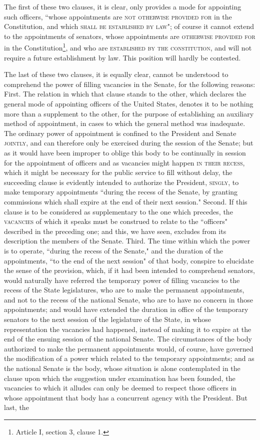 The first of these two clauses, it is clear, only provides a mode for appointing such officers, ``whose appointments are \textsc{not otherwise provided for }in the Constitution, and which \textsc{shall be established by law}"; of course it cannot extend to the appointments of senators, whose appointments are \textsc{otherwise provided for }in the Constitution\footnote{Article I, section 3, clause 1.}, and who are \textsc{established by the constitution}, and will not require a future establishment by law. This position will hardly be contested.

The last of these two clauses, it is equally clear, cannot be understood to comprehend the power of filling vacancies in the Senate, for the following reasons: First. The relation in which that clause stands to the other, which declares the general mode of appointing officers of the United States, denotes it to be nothing more than a supplement to the other, for the purpose of establishing an auxiliary method of appointment, in cases to which the general method was inadequate. The ordinary power of appointment is confined to the President and Senate \textsc{jointly}, and can therefore only be exercised during the session of the Senate; but as it would have been improper to oblige this body to be continually in session for the appointment of officers and as vacancies might happen \textsc{in their recess}, which it might be necessary for the public service to fill without delay, the succeeding clause is evidently intended to authorize the President, \textsc{singly}, to make temporary appointments ``during the recess of the Senate, by granting commissions which shall expire at the end of their next session." Second. If this clause is to be considered as supplementary to the one which precedes, the \textsc{vacancies }of which it speaks must be construed to relate to the ``officers" described in the preceding one; and this, we have seen, excludes from its description the members of the Senate. Third. The time within which the power is to operate, ``during the recess of the Senate," and the duration of the appointments, ``to the end of the next session" of that body, conspire to elucidate the sense of the provision, which, if it had been intended to comprehend senators, would naturally have referred the temporary power of filling vacancies to the recess of the State legislatures, who are to make the permanent appointments, and not to the recess of the national Senate, who are to have no concern in those appointments; and would have extended the duration in office of the temporary senators to the next session of the legislature of the State, in whose representation the vacancies had happened, instead of making it to expire at the end of the ensuing session of the national Senate. The circumstances of the body authorized to make the permanent appointments would, of course, have governed the modification of a power which related to the temporary appointments; and as the national Senate is the body, whose situation is alone contemplated in the clause upon which the suggestion under examination has been founded, the vacancies to which it alludes can only be deemed to respect those officers in whose appointment that body has a concurrent agency with the President. But last, the 